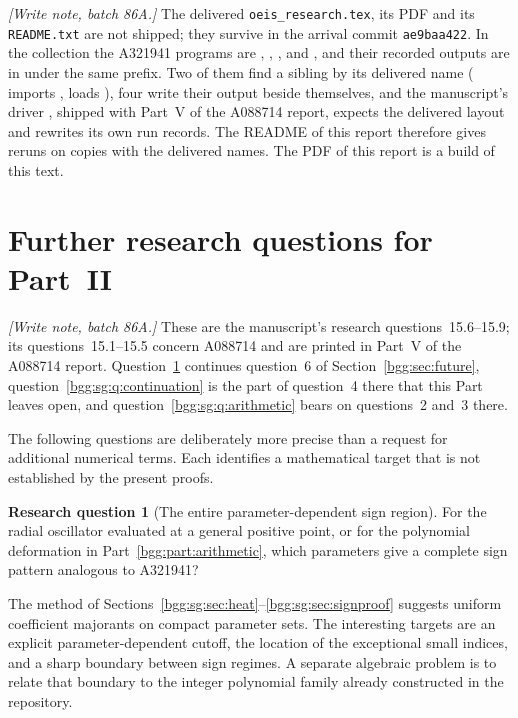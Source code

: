 \documentclass[11pt,a4paper]{article}
\numberwithin{equation}{section}
\theoremstyle{definition}
\theoremstyle{remark}
\theoremstyle{definition}
\newtheorem{question}[theorem]{Research question}
\begin{document}
\emph{[Write note, batch 86A.]} The delivered \texttt{oeis\_research.tex},
its PDF and its \texttt{README.txt} are not shipped; they survive in the
arrival commit \texttt{ae9baa422}. In the collection the A321941
programs are ,
, ,
 and ,
and their recorded outputs are in  under the same prefix.
Two of them find a sibling by its delivered name
( imports ,
 loads ), four
write their output beside themselves, and the manuscript's driver
, shipped with Part~V of the A088714 report,
expects the delivered layout and rewrites its own run records. The
README of this report therefore gives reruns on copies with the
delivered names. The PDF of this report is a build of this text.

\section{Further research questions for Part~II}
\label{bgg:sg:sec:future}

\emph{[Write note, batch 86A.]} These are the manuscript's research
questions~15.6--15.9; its questions~15.1--15.5 concern A088714 and are
printed in Part~V of the A088714 report. Question~\ref{bgg:sg:q:region}
continues question~6 of Section~\ref{bgg:sec:future},
question~\ref{bgg:sg:q:continuation} is the part of question~4 there
that this Part leaves open, and question~\ref{bgg:sg:q:arithmetic}
bears on questions~2 and~3 there.

The following questions are deliberately more precise than a request
for additional numerical terms.  Each identifies a mathematical
target that is not established by the present proofs.

\begin{question}[The entire parameter-dependent sign region]
\label{bgg:sg:q:region}
For the radial oscillator evaluated at a general positive point,
or for the polynomial deformation in Part~\ref{bgg:part:arithmetic}, which
parameters give a complete sign pattern analogous to A321941?
\end{question}
The method of Sections~\ref{bgg:sg:sec:heat}--\ref{bgg:sg:sec:signproof}
suggests uniform coefficient majorants on
compact parameter sets.  The interesting targets are an explicit
parameter-dependent cutoff, the location of the exceptional
small indices, and a sharp boundary between sign regimes.
A separate algebraic problem is to relate that boundary to the
integer polynomial family already constructed in the repository.
\end{document}
